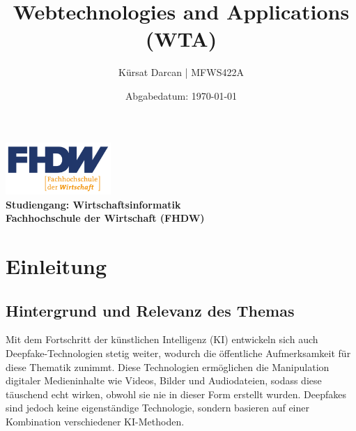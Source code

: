 \documentclass[a4paper,12pt]{article}
\title{\textbf{Webtechnologies and Applications (WTA)}}
\author{Kürsat Darcan | MFWS422A}
\date{Abgabedatum: \today}
\begin{document}
\maketitle
\thispagestyle{empty}
\vspace{2cm}
\begin{center}
    \includegraphics[width=0.3\textwidth]{FHDW_Logo_RGB-01.svg.png} %
    \\
    \vspace{1cm}
    \textbf{Studiengang: Wirtschaftsinformatik}\\
    \textbf{Fachhochschule der Wirtschaft (FHDW)}
\end{center}
\newpage

\renewcommand{\thepage}{\roman{page}} %
\tableofcontents
\newpage



\newpage

\renewcommand{\thepage}{\arabic{page}} %
\setcounter{page}{1}


\section{Einleitung}
\subsection{Hintergrund und Relevanz des Themas}
Mit dem Fortschritt der künstlichen Intelligenz (KI) entwickeln sich auch Deepfake-Technologien stetig weiter, 
wodurch die öffentliche Aufmerksamkeit für diese Thematik zunimmt. 
Diese Technologien ermöglichen die Manipulation digitaler Medieninhalte wie Videos, 
Bilder und Audiodateien, sodass diese täuschend echt wirken, 
obwohl sie nie in dieser Form erstellt wurden. 
Deepfakes sind jedoch keine eigenständige Technologie, 
sondern basieren auf einer Kombination verschiedener KI-Methoden. \cite{BVDW2024}\\
\end{document}
